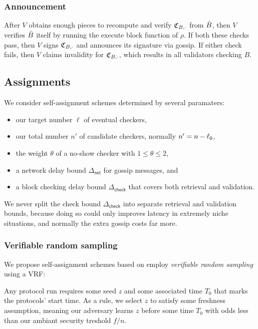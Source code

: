\subsubsection{Announcement}

After $V$ obtains enough pieces to recompute and verify $\mathfrak{C}_{B,\cdot}$ from $\bar{B}$, then $V$ verifies $\bar{B}$ itself by running the execute block function of $\rho$.  If both these checks pass, then $V$ signs $\mathfrak{C}_{B,\cdot}$ and announces its signature via gossip.  If either check fails, then $V$ claims invalidity for $\mathfrak{C}_{B,\cdot}$, which results in all validators checking $B$.


\subsection{Assignments}
\label{sec:assignment}

\newcommand\netdelay{\ensuremath{\Delta_{\mathsf{net}}}}
\newcommand\checkdelay{\ensuremath{\Delta_{\mathsf{check}}}}

We consider self-assignment schemes determined by several paramaters:
\begin{itemize}
\item our target number $\ell$ of eventual checkers,
\item our total number $n'$ of candidate checkers, normally $n' = n - \ell_0$,
\item the weight $\theta$ of a no-show checker with $1 \leq \theta \leq 2$,
\item a network delay bound $\netdelay$ for gossip messages, and
\item a block checking delay bound $\checkdelay$ that covers both retrieval and validation.
\end{itemize}
We never split the check bound $\checkdelay$ into separate retrieval and validation bounds, because doing so could only improves latency in extremely niche situations, and normally the extra gossip costs far more. 

\subsubsection{Verifiable random sampling}

We propose self-assignment schemes based on employ {\em verifiable random sampling} using a VRF:  

Any protocol run requires some seed $z$ and some associated time $T_0$ that marks the protocols' start time.  As a rule, we select $z$ to satisfy some freshness assumption, meaning our adversary learns $z$ before some time $T_0$ with odds less than our ambiant security treshold $f/n$.

